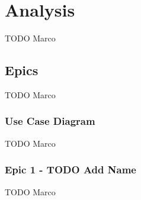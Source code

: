 \section{Analysis}
\label{sec:analysis}

TODO Marco

\subsection{Epics}
\label{ssec:epics}

TODO Marco

\subsubsection{Use Case Diagram}
\label{sssec:use_case_diagram}

TODO Marco

\subsubsection{Epic 1 - TODO Add Name}
\label{sssec:epic1}

TODO Marco


